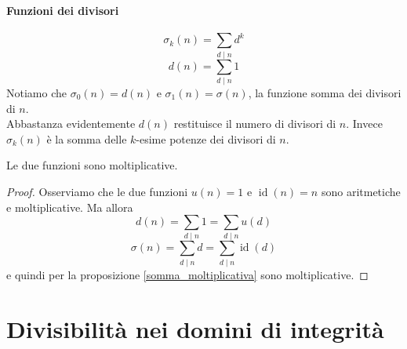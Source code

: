 \paragraph{Funzioni dei divisori}
\begin{equation*}
\sigma_k(n)=\sum_{d\mid n}d^k
\end{equation*}
\begin{equation*}
d(n)=\sum_{d\mid n}1
\end{equation*}
Notiamo che $\sigma_0(n)=d(n)$ e $\sigma_1(n)=\sigma(n)$, la funzione somma dei divisori di $n$. \\ Abbastanza evidentemente $d(n)$ restituisce il numero di divisori di $n$. Invece $\sigma_k(n)$ è la somma delle $k$-esime potenze dei divisori di $n$.
\begin{teorema}
	Le due funzioni sono moltiplicative.
\end{teorema}
\begin{proof}
	Osserviamo che le due funzioni $u(n)=1$ e $\operatorname{id}(n)=n$ sono aritmetiche e moltiplicative. Ma allora
	\begin{equation*}
	d(n)=\sum_{d\mid n}1=\sum_{d\mid n}u(d)
	\end{equation*}
	\begin{equation*}
	\sigma(n)=\sum_{d\mid n}d=\sum_{d\mid n}\operatorname{id}(d)
	\end{equation*}
	e quindi per la proposizione \ref{somma_moltiplicativa} sono moltiplicative.
\end{proof}




\section{Divisibilità nei domini di integrità}
